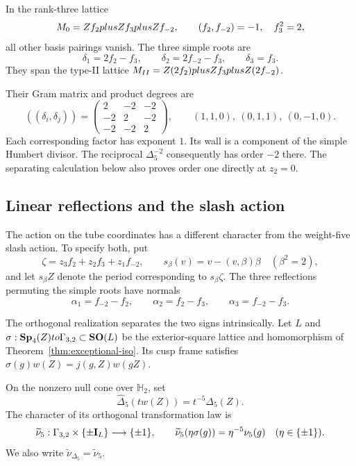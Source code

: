 In the rank-three lattice
\[
 M_0=Z f_2plusZ f_3plusZ f_{-2},\qquad
 (f_2,f_{-2})=-1,\quad f_3^2=2,
\]
all other basis pairings vanish.  The three simple roots are
\[
 \delta_1=2f_2-f_3,\qquad
 \delta_2=2f_{-2}-f_3,\qquad \delta_3=f_3.
\]
They span the type-II lattice
\(M_{II}=Z(2f_2)plusZ f_3plusZ(2f_{-2})\).

Their Gram matrix and product degrees are
\[
 ((\delta_i,\delta_j))=
 \begin{pmatrix}2&-2&-2\\-2&2&-2\\-2&-2&2\end{pmatrix},
 \qquad
 (1,1,0),\ (0,1,1),\ (0,-1,0).
\]
Each corresponding factor has exponent \(1\).
Its wall is a component of the simple Humbert divisor.  The reciprocal
\(\Delta_5^{-2}\) consequently has order \(-2\) there.
The separating calculation below also proves order one directly at
\(z_2=0\).

\subsection{Linear reflections and the slash action}
\label{ssec:view1-maass-character-walls}

The action on the tube coordinates has a different character from the
weight-five slash action.  To specify both, put
\[
 \zeta=z_3f_2+z_2f_3+z_1f_{-2},\qquad
 s_\beta(v)=v-(v,\beta)\beta\quad(\beta^2=2),
\]
and let \(s_\beta Z\) denote the period corresponding to
\(s_\beta\zeta\).
The three reflections permuting the simple roots have normals
\[
 \alpha_1=f_{-2}-f_2,\qquad
 \alpha_2=f_2-f_3,\qquad
 \alpha_3=f_{-2}-f_3.
\]

The orthogonal realization separates the two signs intrinsically.
Let \(L\) and \(\sigma:\mathbf{Sp}_4(Z)to\Gamma_{3,2}\subset\mathbf{SO}(L)\)
be the exterior-square lattice and homomorphism of
Theorem~\ref{thm:exceptional-iso}. Its cusp frame satisfies
\(\sigma(g)w(Z)=j(g,Z)w(gZ)\).

\begin{definition}
\label{def:homogeneous-orthogonal-character}
On the nonzero null cone over \(\mathbb H_2\), set
\[
 \widehat\Delta_5(tw(Z))=t^{-5}\Delta_5(Z).
\]
The character of its orthogonal transformation law is
\[
 \widetilde\nu_5:\Gamma_{3,2}\times\{\pm\mathbf{I}_L\}\longrightarrow\{\pm1\},
 \qquad
 \widetilde\nu_5(\eta\sigma(g))=\eta^{-5}\nu_5(g)
 \quad(\eta\in\{\pm1\}).
\]
We also write \(\widetilde\nu_{\Delta_5}=\widetilde\nu_5\).
\end{definition}

